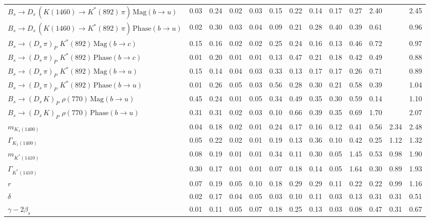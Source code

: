 \begin{tabular}{l  c  c  c  c  c  c  c  c  c  c  c  | c }
$B_s \to D_s \, ( K(1460) \to K^{*}(892) \, \pi ) \, \text{Mag} (b \to u)$ & 0.03 & 0.24 & 0.02 & 0.03 & 0.15 & 0.22 & 0.14 & 0.17 & 0.27 & 2.40 &  & 2.45 \\ 
$B_s \to D_s \, ( K(1460) \to K^{*}(892) \, \pi ) \, \text{Phase} (b \to u)$ & 0.02 & 0.30 & 0.03 & 0.04 & 0.09 & 0.21 & 0.28 & 0.40 & 0.39 & 0.61 &  & 0.96 \\ 
$B_s \to ( D_s \, \pi)_{P} \, \, K^{*}(892) \, \text{Mag} (b \to c)$ & 0.15 & 0.16 & 0.02 & 0.02 & 0.25 & 0.24 & 0.16 & 0.13 & 0.46 & 0.72 &  & 0.97 \\ 
$B_s \to ( D_s \, \pi)_{P} \, \, K^{*}(892) \, \text{Phase} (b \to c)$ & 0.01 & 0.20 & 0.01 & 0.01 & 0.13 & 0.47 & 0.21 & 0.18 & 0.42 & 0.49 &  & 0.88 \\ 
$B_s \to ( D_s \, \pi)_{P} \, \, K^{*}(892) \, \text{Mag} (b \to u)$ & 0.15 & 0.14 & 0.04 & 0.03 & 0.33 & 0.13 & 0.17 & 0.17 & 0.26 & 0.71 &  & 0.89 \\ 
$B_s \to ( D_s \, \pi)_{P} \, \, K^{*}(892) \, \text{Phase} (b \to u)$ & 0.01 & 0.26 & 0.05 & 0.03 & 0.56 & 0.28 & 0.30 & 0.21 & 0.58 & 0.39 &  & 1.04 \\ 
$B_s \to ( D_s \, K)_{P} \, \, \rho(770) \, \text{Mag} (b \to u)$ & 0.45 & 0.24 & 0.01 & 0.05 & 0.34 & 0.49 & 0.35 & 0.30 & 0.59 & 0.14 &  & 1.10 \\ 
$B_s \to ( D_s \, K)_{P} \, \, \rho(770) \, \text{Phase} (b \to u)$ & 0.31 & 0.31 & 0.02 & 0.03 & 0.10 & 0.66 & 0.39 & 0.35 & 0.69 & 1.70 &  & 2.07 \\ 
$m_{K_1(1400)} $ & 0.04 & 0.18 & 0.02 & 0.01 & 0.24 & 0.17 & 0.16 & 0.12 & 0.41 & 0.56 & 2.34 & 2.48 \\ 
$\Gamma_{K_1(1400)}$ & 0.05 & 0.22 & 0.02 & 0.01 & 0.19 & 0.13 & 0.36 & 0.10 & 0.42 & 0.25 & 1.12 & 1.32 \\ 
$m_{K^{*}(1410)}$ & 0.08 & 0.19 & 0.01 & 0.01 & 0.34 & 0.11 & 0.30 & 0.05 & 1.45 & 0.53 & 0.98 & 1.90 \\ 
$\Gamma_{K^{*}(1410)}$ & 0.30 & 0.17 & 0.01 & 0.01 & 0.07 & 0.18 & 0.14 & 0.05 & 1.64 & 0.30 & 0.89 & 1.93 \\ 
$r$ & 0.07 & 0.19 & 0.05 & 0.10 & 0.18 & 0.29 & 0.29 & 0.11 & 0.22 & 0.22 & 0.99 & 1.16 \\ 
$\delta$ & 0.02 & 0.17 & 0.04 & 0.05 & 0.03 & 0.10 & 0.11 & 0.03 & 0.13 & 0.31 & 0.31 & 0.51 \\ 
$\gamma - 2 \beta_{s}$ & 0.01 & 0.11 & 0.05 & 0.07 & 0.18 & 0.25 & 0.13 & 0.03 & 0.08 & 0.47 & 0.31 & 0.67 \\ 
\hline
\hline
\end{tabular}
